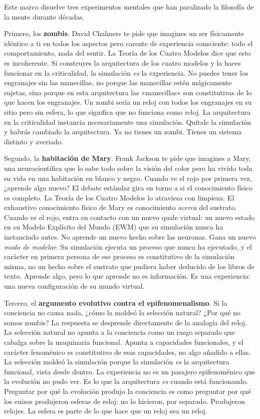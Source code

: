 \documentclass[11pt, twoside, openright]{book}
\begin{document}
Este marco disuelve tres experimentos mentales que han paralizado la filosofía de la mente durante décadas.

Primero, los \textbf{zombis}. David Chalmers te pide que imagines un ser físicamente idéntico a ti en todos los aspectos pero carente de experiencia consciente: todo el comportamiento, nada del sentir. La Teoría de los Cuatro Modelos dice que esto es incoherente. Si construyes la arquitectura de los cuatro modelos y la haces funcionar en la criticalidad, la simulación \textit{es} la experiencia. No puedes tener los engranajes sin las manecillas, no porque las manecillas estén mágicamente sujetas, sino porque en esta arquitectura las «manecillas» son constitutivas de lo que hacen los engranajes. Un zombi sería un reloj con todos los engranajes en su sitio pero sin esfera, lo que significa que no funciona como reloj. La arquitectura en la criticalidad instancia necesariamente una simulación. Quítale la simulación y habrás cambiado la arquitectura. Ya no tienes un zombi. Tienes un sistema distinto y averiado.

Segundo, la \textbf{habitación de Mary}. Frank Jackson te pide que imagines a Mary, una neurocientífica que lo sabe todo sobre la visión del color pero ha vivido toda su vida en una habitación en blanco y negro. Cuando ve el rojo por primera vez, ¿aprende algo nuevo? El debate estándar gira en torno a si el conocimiento físico es completo. La Teoría de los Cuatro Modelos lo atraviesa con limpieza. El exhaustivo conocimiento físico de Mary es conocimiento \textit{acerca} del sustrato. Cuando ve el rojo, entra en contacto con un nuevo quale virtual: un nuevo estado en su Modelo Explícito del Mundo (EWM) que su simulación nunca ha instanciado antes. No aprende un nuevo hecho sobre las neuronas. Gana un nuevo \textit{modo de modelar}. Su simulación ejecuta un proceso que nunca ha ejecutado, y el carácter en primera persona de ese proceso es constitutivo de la simulación misma, no un hecho sobre el sustrato que pudiera haber deducido de los libros de texto. Aprende algo, pero lo que aprende no es información. Es una experiencia: una nueva configuración de su mundo virtual.

Tercero, el \textbf{argumento evolutivo contra el epifenomenalismo}. Si la conciencia no causa nada, ¿cómo la moldeó la selección natural? ¿Por qué no somos zombis? La respuesta se desprende directamente de la analogía del reloj. La selección natural no apunta a la conciencia como un rasgo separado que cabalga sobre la maquinaria funcional. Apunta a capacidades funcionales, y el carácter fenoménico es constitutivo de esas capacidades, no algo añadido a ellas. La selección moldeó la simulación porque la simulación \textit{es} la arquitectura funcional, vista desde dentro. La experiencia no es un pasajero epifenoménico que la evolución no pudo ver. Es lo que la arquitectura \textit{es} cuando está funcionando. Preguntar por qué la evolución produjo la conciencia es como preguntar por qué los suizos produjeron esferas de reloj: no lo hicieron, por separado. Produjeron relojes. La esfera es parte de lo que hace que un reloj sea un reloj.
\end{document}
